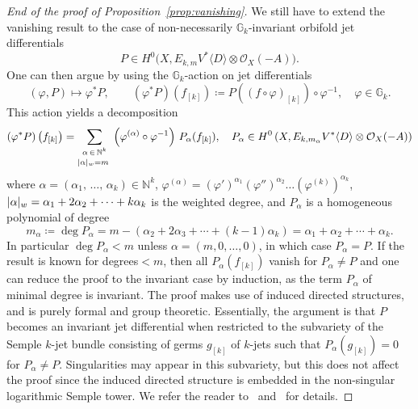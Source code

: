 \documentclass[AHL,Unicode,longabstracts,published]{cedram}
\DeclarePairedDelimiter{\abs}{\lvert}{\rvert}
\newcommand*\cO{\mathcal{O}}
\newcommand*\bG{\mathbb{G}}
\newcommand*\bN{\mathbb{N}}
\newcommand*\bydef{\coloneqq}
\begin{document}
\begin{proof}[End of the proof of Proposition~\ref{prop:vanishing}]
We still have to extend the vanishing result to the case of non-necessarily $\bG_k$-invariant orbifold jet differentials
\[
P\in H^0\big(X,E_{k,m}V^*\langle D\rangle\otimes\cO_X(-A)\big).
\]
One can then argue by using the $\bG_k$-action on jet differentials
\[
(\varphi,P)\mapsto\varphi^*P,\qquad \left(\varphi^*P\right)(f_{[k]})
\bydef P((f\circ\varphi)_{[k]})\circ\varphi^{-1},\quad
\varphi\in\bG_k.
\]
This action yields a decomposition
\[
\left(\varphi^*P\right)\left(f_{[k]}\right) =
\sum_{\substack{
\alpha\,\in\,\bN^k\\
\abs{\alpha}_w=m \phantom{\textstyle|} }} \left(\varphi^{(\alpha)}
\circ\varphi^{-1}\right)\,P_\alpha(f_{[k]}),\quad P_\alpha\in H^0\left(X,E_{k,m_\alpha}V^*\langle D\rangle\otimes\cO_X(-A)\right)
\]
where $\alpha=(\alpha_1,\,\dotsc,\,\alpha_k)\in\bN^k$,
$\varphi^{(\alpha)}=(\varphi')^{\alpha_1}(\varphi'')^{\alpha_2}\ldots (\varphi^{(k)})^{\alpha_k}$,
$\abs{\alpha}_w=\alpha_1+2\alpha_2+\dotsb+k\alpha_k$ is the weighted degree, and $P_\alpha$ is a homogeneous polynomial of degree
\[
m_\alpha
\bydef
\deg P_\alpha=m-(\alpha_2+2\alpha_3+\dotsb+(k-1)\alpha_k)=
\alpha_1+\alpha_2+\dotsb+\alpha_k.
\]
In particular $\deg P_\alpha<m$ unless $\alpha=(m,0,\dotsc,0)$, in which case
$P_\alpha=P$. If the result is known for degrees${}<m$, then all
$P_\alpha(f_{[k]})$ vanish for $P_\alpha\ne P$ and one can reduce the proof to the invariant case by induction, as the term $P_\alpha$ of minimal degree is invariant. The proof makes use of induced directed structures, and is purely formal and group theoretic. Essentially, the argument is that $P$ becomes an invariant jet differential when restricted to the subvariety of the Semple $k$-jet bundle consisting of germs $g_{[k]}$ of $k$-jets such that $P_\alpha(g_{[k]})=0$ for
$P_\alpha\ne P$. Singularities may appear in this subvariety, but this does not affect the proof since the induced directed structure is embedded in the non-singular logarithmic Semple tower. We refer the reader to~\cite[\S~7.E]{Dem20} and~\cite[Theorem~8.15]{Dem20} for details.
\end{proof}



\end{document}
